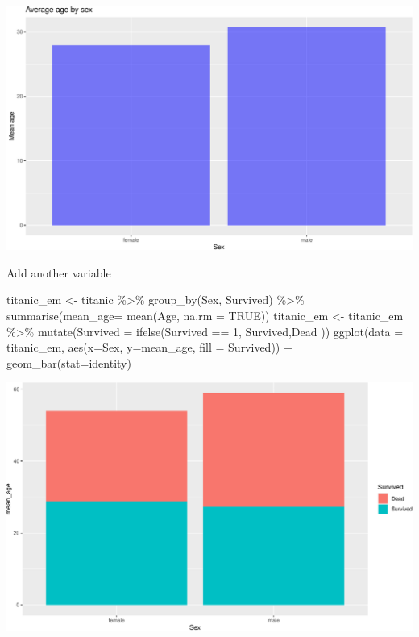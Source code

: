 \documentclass[
]{book}
\newenvironment{Shaded}{\begin{snugshade}}{\end{snugshade}}
\newcommand{\AttributeTok}[1]{\textcolor[rgb]{0.77,0.63,0.00}{#1}}
\newcommand{\ConstantTok}[1]{\textcolor[rgb]{0.00,0.00,0.00}{#1}}
\newcommand{\DecValTok}[1]{\textcolor[rgb]{0.00,0.00,0.81}{#1}}
\newcommand{\FunctionTok}[1]{\textcolor[rgb]{0.00,0.00,0.00}{#1}}
\newcommand{\NormalTok}[1]{#1}
\newcommand{\OtherTok}[1]{\textcolor[rgb]{0.56,0.35,0.01}{#1}}
\newcommand{\SpecialCharTok}[1]{\textcolor[rgb]{0.00,0.00,0.00}{#1}}
\newcommand{\StringTok}[1]{\textcolor[rgb]{0.31,0.60,0.02}{#1}}
\begin{document}
\includegraphics{figures/unnamed-chunk-144-1.pdf}

Add another variable

\begin{Shaded}
\begin{Highlighting}[]
\NormalTok{titanic\_em }\OtherTok{\textless{}{-}}\NormalTok{ titanic }\SpecialCharTok{\%\textgreater{}\%} \FunctionTok{group\_by}\NormalTok{(Sex, Survived) }\SpecialCharTok{\%\textgreater{}\%} \FunctionTok{summarise}\NormalTok{(}\AttributeTok{mean\_age=} \FunctionTok{mean}\NormalTok{(Age, }\AttributeTok{na.rm =} \ConstantTok{TRUE}\NormalTok{))}
\NormalTok{titanic\_em }\OtherTok{\textless{}{-}}\NormalTok{ titanic\_em }\SpecialCharTok{\%\textgreater{}\%} \FunctionTok{mutate}\NormalTok{(}\AttributeTok{Survived =} \FunctionTok{ifelse}\NormalTok{(Survived }\SpecialCharTok{==} \DecValTok{1}\NormalTok{, }\StringTok{\textquotesingle{}Survived\textquotesingle{}}\NormalTok{,}\StringTok{\textquotesingle{}Dead\textquotesingle{}}\NormalTok{ ))}
\FunctionTok{ggplot}\NormalTok{(}\AttributeTok{data =}\NormalTok{ titanic\_em, }\FunctionTok{aes}\NormalTok{(}\AttributeTok{x=}\NormalTok{Sex, }\AttributeTok{y=}\NormalTok{mean\_age, }\AttributeTok{fill =}\NormalTok{ Survived)) }\SpecialCharTok{+} \FunctionTok{geom\_bar}\NormalTok{(}\AttributeTok{stat=}\StringTok{\textquotesingle{}identity\textquotesingle{}}\NormalTok{)}
\end{Highlighting}
\end{Shaded}

\includegraphics{figures/unnamed-chunk-145-1.pdf}
\end{document}

